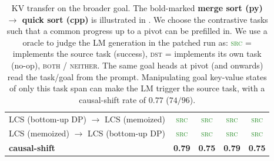 \begin{table}[h!]
\begin{tabular}{lcccc}
LCS (bottom-up DP) $\to$ LCS (memoized) & \textcolor{ForestGreen}{\textsc{src}} & \textcolor{ForestGreen}{\textsc{src}} & \textcolor{ForestGreen}{\textsc{src}} & \textcolor{ForestGreen}{\textsc{src}} \\
LCS (memoized) $\to$ LCS (bottom-up DP) & \textcolor{ForestGreen}{\textsc{src}} & \textcolor{ForestGreen}{\textsc{src}} & \textcolor{ForestGreen}{\textsc{src}} & \textcolor{ForestGreen}{\textsc{src}} \\
\midrule
\textbf{causal-shift} & \textbf{0.79} & \textbf{0.75} & \textbf{0.79} & \textbf{0.75} \\
\bottomrule
\end{tabular}
\caption{\small KV transfer on the broader goal. The bold-marked \textbf{merge sort (py) $\rightarrow$ quick sort (cpp)} is illustrated in . We choose the contrastive tasks such that a common progress up to a pivot can be prefilled in. We use a oracle to judge the LM generation in the patched run as: \textcolor{ForestGreen}{\textsc{src}} = implements the source task (success), \textsc{dst} = implements its own task (no-op), \textsc{both} / \textsc{neither}. The same goal heads at pivot (and onwards) read the task/goal from the prompt. Manipulating goal key-value states of only this task span can make the LM trigger the source task, with a causal-shift rate of $0.77$ ($74/96$).}
\label{tab:kv-goal}
\end{table}
